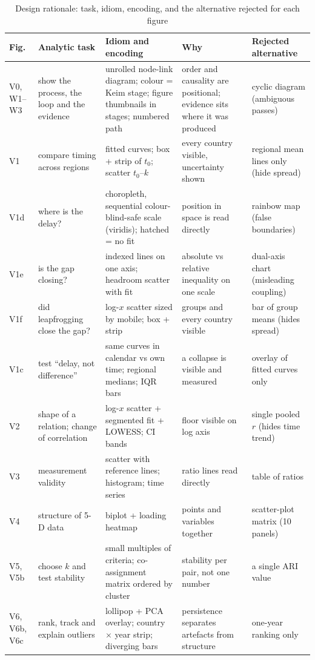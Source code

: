 \documentclass[conference,a4paper]{IEEEtran}
\begin{document}
\begin{table}[!t]
\centering
\caption{Design rationale: task, idiom, encoding, and the alternative rejected for each figure}
\label{tab:design}
\footnotesize
\begin{tabularx}{\textwidth}{@{}l Y Y Y Y@{}}
\toprule
Fig. & Analytic task & Idiom and encoding & Why & Rejected alternative \\
\midrule
V0, W1--W3 & show the process, the loop and the evidence & unrolled node-link diagram; colour = Keim stage; figure thumbnails in stages; numbered path & order and causality are positional; evidence sits where it was produced & cyclic diagram (ambiguous passes)~\cite{keim2008scope} \\
V1 & compare timing across regions & fitted curves; box + strip of $t_0$; scatter $t_0$--$k$ & every country visible, uncertainty shown & regional mean lines only (hide spread) \\
V1d & where is the delay? & choropleth, sequential colour-blind-safe scale (viridis); hatched = no fit & position in space is read directly & rainbow map (false boundaries) \\
V1e & is the gap closing? & indexed lines on one axis; headroom scatter with fit & absolute vs relative inequality on one scale & dual-axis chart (misleading coupling) \\
V1f & did leapfrogging close the gap? & log-$x$ scatter sized by mobile; box + strip & groups and every country visible & bar of group means (hides spread) \\
V1c & test ``delay, not difference'' & same curves in calendar vs own time; regional medians; IQR bars & a collapse is visible and measured & overlay of fitted curves only \\
V2 & shape of a relation; change of correlation & log-$x$ scatter + segmented fit + LOWESS; CI bands & floor visible on log axis & single pooled $r$ (hides time trend) \\
V3 & measurement validity & scatter with reference lines; histogram; time series & ratio lines read directly & table of ratios \\
V4 & structure of 5-D data & biplot + loading heatmap & points and variables together & scatter-plot matrix (10 panels) \\
V5, V5b & choose $k$ and test stability & small multiples of criteria; co-assignment matrix ordered by cluster & stability per pair, not one number & a single ARI value \\
V6, V6b, V6c & rank, track and explain outliers & lollipop + PCA overlay; country $\times$ year strip; diverging bars & persistence separates artefacts from structure & one-year ranking only \\

\end{tabularx}
\end{table}
\end{document}
